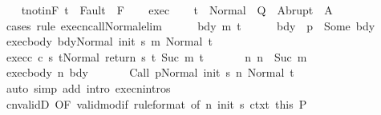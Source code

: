 \begin{isabellebody}
\ \ \isamarkupfalse%
\ t{\isacharunderscore}notin{\isacharunderscore}F{\isacharcolon}\ {\isachardoublequoteopen}t\ {\isasymnotin}\ Fault\ {\isacharbackquote}\ F{\isachardoublequoteclose}\isanewline
\ \ \isamarkupfalse%
\ exec\isanewline
\ \ \isamarkupfalse%
\ {\isachardoublequoteopen}t\ {\isasymin}\ Normal\ {\isacharbackquote}\ Q\ {\isasymunion}\ Abrupt\ {\isacharbackquote}\ A{\isachardoublequoteclose}\isanewline
\ \ \isamarkupfalse%
\ {\isacharparenleft}cases\ rule{\isacharcolon}\ execn{\isacharunderscore}call{\isacharunderscore}Normal{\isacharunderscore}elim{\isacharparenright}\isanewline
\ \ \ \ \isamarkupfalse%
\ bdy\ m\ t{\isacharprime}\isanewline
\ \ \ \ \isamarkupfalse%
\ bdy{\isacharcolon}\ {\isachardoublequoteopen}{\isasymGamma}\ p\ {\isacharequal}\ Some\ bdy{\isachardoublequoteclose}\isanewline
\ \ \ \ \isamarkupfalse%
\ exec{\isacharunderscore}body{\isacharcolon}\ {\isachardoublequoteopen}{\isasymGamma}{\isasymturnstile}{\isasymlangle}bdy{\isacharcomma}Normal\ {\isacharparenleft}init\ s{\isacharparenright}{\isasymrangle}\ {\isacharequal}m{\isasymRightarrow}\ Normal\ t{\isacharprime}{\isachardoublequoteclose}\ \isanewline
\ \ \ \ \isamarkupfalse%
\ exec{\isacharunderscore}c{\isacharcolon}\ {\isachardoublequoteopen}{\isasymGamma}{\isasymturnstile}{\isasymlangle}c\ s\ t{\isacharprime}{\isacharcomma}Normal\ {\isacharparenleft}return\ s\ t{\isacharprime}{\isacharparenright}{\isasymrangle}\ {\isacharequal}Suc\ m{\isasymRightarrow}\ t{\isachardoublequoteclose}\ \isanewline
\ \ \ \ \isamarkupfalse%
\ n{\isacharcolon}\ {\isachardoublequoteopen}n\ {\isacharequal}\ Suc\ m{\isachardoublequoteclose}\isanewline
\ \ \ \ \isamarkupfalse%
\ exec{\isacharunderscore}body\ n\ bdy\ \isanewline
\ \ \ \ \isamarkupfalse%
\ {\isachardoublequoteopen}{\isasymGamma}{\isasymturnstile}{\isasymlangle}Call\ p{\isacharcomma}Normal\ {\isacharparenleft}init\ s{\isacharparenright}{\isasymrangle}\ {\isacharequal}n{\isasymRightarrow}\ Normal\ t{\isacharprime}{\isachardoublequoteclose}\isanewline
\ \ \ \ \ \ \isamarkupfalse%
\ {\isacharparenleft}auto\ simp\ add{\isacharcolon}\ intro{\isacharcolon}\ execn{\isachardot}intros{\isacharparenright}\isanewline
\ \ \ \ \isamarkupfalse%
\ cnvalidD\ {\isacharbrackleft}OF\ valid{\isacharunderscore}modif\ {\isacharbrackleft}rule{\isacharunderscore}format{\isacharcomma}\ of\ n\ {\isachardoublequoteopen}init\ s{\isachardoublequoteclose}{\isacharbrackright}\ ctxt\ this{\isacharbrackright}\ P\isanewline

\end{isabellebody}
